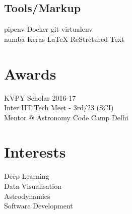 \documentclass[a4paper]{deedy-resume-openfont}
\begin{document}
\begin{minipage}[t]{0.33\textwidth}
\subsection{Tools/Markup}
pipenv  \textbullet{} Docker\textbullet{} 
git \textbullet{}  virtualenv \\  numba \textbullet{} Keras\textbullet{}
\LaTeX \textbullet{} ReStrctured Text \\
\section{Awards}
KVPY Scholar 2016-17\\
Inter IIT Tech Meet - 3rd/23 (SCI)\\
Mentor @ Astronomy Code Camp Delhi

\section{Interests}
Deep Learning\\
Data Visualisation\\
Astrodynamics\\
Software Development

%
%

\end{minipage} 
\hfill
\end{document}
